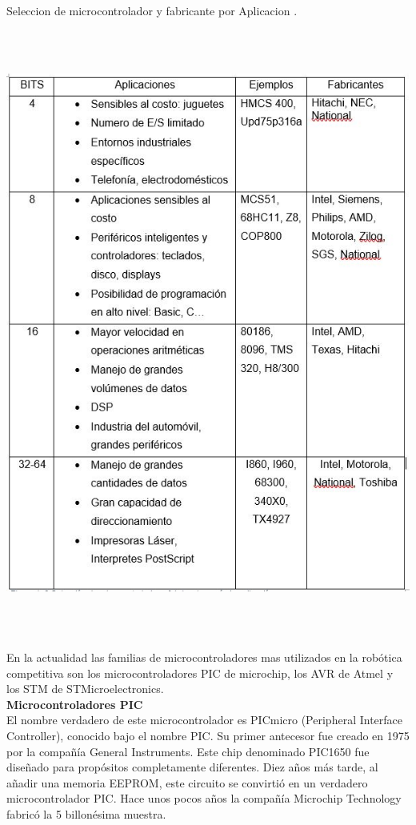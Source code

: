 \documentclass[12pt,a4paper]{article}
\begin{document}
   \begin{table}[htpb]
   \centering
   \caption{Seleccion de microcontrolador y fabricante por Aplicacion \cite{Ravi}.}
    \includegraphics[height=20cm]{Tabla}
  
   \label{fig:TablaAplicaciones}
   \end{table}
   
 
  
   En la actualidad las familias de microcontroladores mas utilizados en la robótica competitiva son los microcontroladores PIC de microchip, los AVR de Atmel y los STM de STMicroelectronics.\\ 
   
   \textbf{Microcontroladores PIC} \\
   El nombre verdadero de este microcontrolador es PICmicro (Peripheral Interface Controller), conocido bajo el nombre PIC. Su primer antecesor fue creado en 1975 por la compañía General Instruments. Este chip denominado PIC1650 fue diseñado para propósitos completamente diferentes. Diez años más tarde, al añadir una memoria EEPROM, este circuito se convirtió en un verdadero microcontrolador PIC. Hace unos pocos años la compañía Microchip Technology fabricó la 5 billonésima muestra.\\
   
\end{document}
